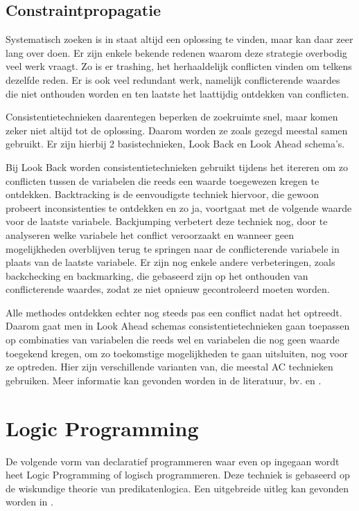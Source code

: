 \subsection{Constraintpropagatie}

Systematisch zoeken is in staat altijd een oplossing te vinden, maar kan daar zeer lang over doen. Er zijn enkele bekende redenen waarom deze strategie overbodig veel werk vraagt. Zo is er trashing, het herhaaldelijk conflicten vinden om telkens dezelfde reden. Er is ook veel redundant werk, namelijk conflicterende waardes die niet onthouden worden en ten laatste het laattijdig ontdekken van conflicten.

Consistentietechnieken daarentegen beperken de zoekruimte snel, maar komen zeker niet altijd tot de oplossing. Daarom worden ze zoals gezegd meestal samen gebruikt. Er zijn hierbij 2 basistechnieken, Look Back en Look Ahead schema's.

Bij Look Back worden consistentietechnieken gebruikt tijdens het itereren om zo conflicten tussen de variabelen die reeds een waarde toegewezen kregen te ontdekken. Backtracking is de eenvoudigste techniek hiervoor, die gewoon probeert inconsistenties te ontdekken en zo ja, voortgaat met de volgende waarde voor de laatste variabele. Backjumping verbetert deze techniek nog, door te analyseren welke variabele het conflict veroorzaakt en wanneer geen mogelijkheden overblijven terug te springen naar de conflicterende variabele in plaats van de laatste variabele. Er zijn nog enkele andere verbeteringen, zoals backchecking en backmarking, die gebaseerd zijn op het onthouden van conflicterende waardes, zodat ze niet opnieuw gecontroleerd moeten worden.

Alle methodes ontdekken echter nog steeds pas een conflict nadat het optreedt. Daarom gaat men in Look Ahead schemas consistentietechnieken gaan toepassen op combinaties van variabelen die reeds wel en variabelen die nog geen waarde toegekend kregen, om zo toekomstige mogelijkheden te gaan uitsluiten, nog voor ze optreden. Hier zijn verschillende varianten van, die meestal AC technieken gebruiken. Meer informatie kan gevonden worden in de literatuur, bv. \cite{bartak01} en \cite{bartak99constraint}.

\section{Logic Programming}

De volgende vorm van declaratief programmeren waar even op ingegaan wordt heet Logic Programming of logisch programmeren. Deze techniek is gebaseerd op de wiskundige theorie van predikatenlogica. Een uitgebreide uitleg kan gevonden worden in \cite{introlp}.

